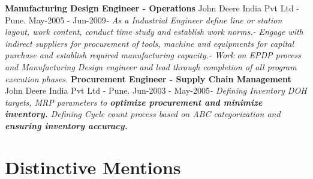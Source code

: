 \documentclass[11pt, a4paper]{awesome-cv}
\begin{document}
\newline \vspace{2mm} \newline
\textbf{Manufacturing Design Engineer - Operations} \hfill John Deere
India Pvt Ltd - Pune\newline . \hfill May-2005 -
Jun-2009\newline \textit{- \hspace{5mm}  As a Industrial Engineer define line or station layout, work content, conduct time study and establish work norms.\newline - \hspace{5mm}  Engage with indirect suppliers for procurement of tools, machine and equipments for capital purchase and establish required manufacturing capacity.\newline - \hspace{5mm}  Work on EPDP process and Manufacturing Design engineer and lead through completion of all program execution phases.}
\newline \vspace{2mm} \newline
\textbf{Procurement Engineer - Supply Chain Management} \hfill John
Deere India Pvt Ltd - Pune\newline . \hfill Jun-2003 -
May-2005\newline \textit{- \hspace{5mm}  Defining Inventory DOH targets,  MRP parameters to \textbf{optimize procurement and minimize inventory.} Defining Cycle count process based on ABC categorization and \textbf{ensuring inventory accuracy.}}
\newline \vspace{2mm} \newline

\hypertarget{distinctive-mentions}{%
\section{Distinctive Mentions}\label{distinctive-mentions}}
\end{document}
